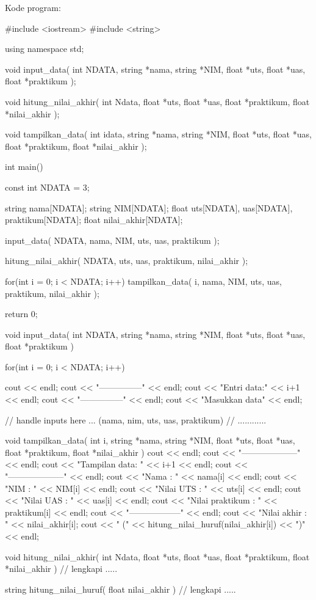\documentclass[a4paper,11pt]{extarticle}
\begin{document}
Kode program:
\begin{cppcode}
#include <iostream>
#include <string>

using namespace std;

void input_data(
  int NDATA,
  string *nama, string *NIM, float *uts, float *uas, float *praktikum
);

void hitung_nilai_akhir(
  int Ndata,
  float *uts, float *uas, float *praktikum,
  float *nilai_akhir
);

void tampilkan_data(
  int idata,
  string *nama, string *NIM, float *uts, float *uas, float *praktikum,
  float *nilai_akhir
);

int main()
{
  const int NDATA = 3;
  
  string nama[NDATA];
  string NIM[NDATA];
  float uts[NDATA], uas[NDATA], praktikum[NDATA];
  float nilai_akhir[NDATA];

  input_data( NDATA, nama, NIM, uts, uas, praktikum );

  hitung_nilai_akhir( NDATA, uts, uas, praktikum, nilai_akhir );

  for(int i = 0; i < NDATA; i++) {
    tampilkan_data( i, nama, NIM, uts, uas, praktikum, nilai_akhir );
  }

  return 0;

}

void input_data(
  int NDATA,
  string *nama, string *NIM, float *uts, float *uas, float *praktikum
)
{
  for(int i = 0; i < NDATA; i++) {
    cout << endl;
    cout << "---------------" << endl;
    cout << "Entri data:" << i+1 << endl;
    cout << "---------------" << endl;
    cout << "Masukkan data" << endl;
    
    // handle inputs here ... (nama, nim, uts, uas, praktikum)
    // ............
  }
}

void tampilkan_data(
  int i,
  string *nama, string *NIM, float *uts, float *uas, float *praktikum,
  float *nilai_akhir
)
{
  cout << endl;
  cout << "--------------------" << endl;
  cout << "Tampilan data: " << i+1 << endl;
  cout << "--------------------" << endl;
  cout << "Nama            : " << nama[i] << endl;
  cout << "NIM             : " << NIM[i] << endl;
  cout << "Nilai UTS       : " << uts[i] << endl;
  cout << "Nilai UAS       : " << uas[i] << endl;
  cout << "Nilai praktikum : " << praktikum[i] << endl;
  cout << "------------------" << endl;
  cout << "Nilai akhir     : " << nilai_akhir[i];
  cout << " (" << hitung_nilai_huruf(nilai_akhir[i]) << ")" << endl;
}

void hitung_nilai_akhir(
  int Ndata,
  float *uts, float *uas, float *praktikum,
  float *nilai_akhir
)
{
  // lengkapi .....
}


string hitung_nilai_huruf( float nilai_akhir )
{
  // lengkapi .....
}
\end{cppcode}
\end{document}
